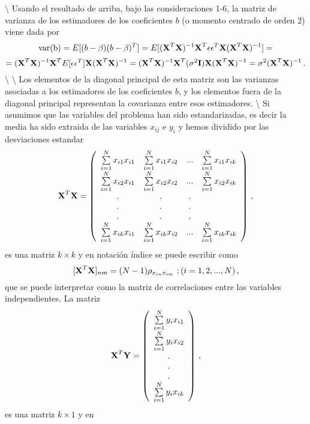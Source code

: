 \documentclass[
]{agujournal2019}
\begin{document}
\vspace{0.5cm}

 \textbackslash{}
\noindent Usando el resultado de arriba, bajo las consideraciones 1-6,
la matriz de varianza de los estimadores de los coeficientes \(b\) (o
momento centrado de orden 2) viene dada por
\[{\rm var(b)}=E[(b-\beta)(b-\beta)^T]=E[({\textbf X}^T{\textbf X})^{-1}{\textbf X}^T\epsilon \epsilon^T{\textbf X}
    ({\textbf X}^T{\textbf X})^{-1}]=\]
\[=({\textbf X}^T{\textbf X})^{-1}{\textbf X}^T E[\epsilon \epsilon^T]{\textbf X}({\textbf X}^T{\textbf X})^{-1}=
    ({\textbf X}^T{\textbf X})^{-1}{\textbf X}^T(\sigma^2{\textbf I}){\textbf X}({\textbf X}^T{\textbf X})^{-1}=
    \sigma^2({\textbf X}^T{\textbf X})^{-1}\,.\] \textbackslash{}
\textbackslash{} \noindent Los elementos de la diagonal principal de
esta matriz son las varianzas asociadas a los estimadores de los
coeficientes \(b\), y los elementos fuera de la diagonal principal
representan la covarianza entre esos estimadores. \textbackslash{} Si
asumimos que las variables del problema han sido estandarizadas, es
decir la media ha sido extraida de las variables \(x_{ij}\) e \(y_i\) y
hemos dividido por las desviaciones estandar
\[{\textbf X}^T{\textbf X}=\left(\begin{array}{cccc}
   \sum\limits_{i=1}^N{x_{i1}x_{i1}} & \sum\limits_{i=1}^N{x_{i1}x_{i2}} & ... & \sum\limits_{i=1}^N{x_{i1}x_{ik}}\\
   \sum\limits_{i=1}^N{x_{i2}x_{i1}} & \sum\limits_{i=1}^N{x_{i2}x_{i2}} & ... & \sum\limits_{i=1}^N{x_{i2}x_{ik}}\\
                . & . & . \\
        . & . & . \\
        . & . & . \\
   \sum\limits_{i=1}^N{x_{ik}x_{i1}} & \sum\limits_{i=1}^N{x_{ik}x_{i2}} & ... & \sum\limits_{i=1}^N{x_{ik}x_{ik}}\\
        \end{array}\right)\,,\] es una matriz \(k\times k\) y en
notación índice se puede escribir como
\[[{\textbf X}^T{\textbf X}]_{nm}=(N-1)\rho_{x_{in} x_{im}}\,\,;(i=1,2,...,N)\,,\]
que se puede interpretar como la matriz de correlaciones entre las
variables independientes. La matriz
\[{\textbf X}^T{\textbf Y}=\left(\begin{array}{c}
  \sum\limits_{i=1}^N y_i x_{i1}\\
  \sum\limits_{i=1}^N y_i x_{i2}\\
                   . \\
           . \\
           . \\
  \sum\limits_{i=1}^N y_i x_{ik}\\
        \end{array}\right)\,,\] es una matriz \(k\times 1\) y en
\end{document}
